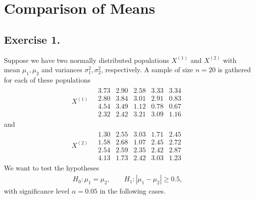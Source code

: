 \section*{Comparison of Means}

\subsection*{Exercise 1.}

Suppose we have two normally distributed populations $X^{(1)}$ and $X^{(2)}$ with mean $\mu_1, \mu_2$ and variances $\sigma_1^2, \sigma_2^2$, respectively. A sample of size $n = 20$ is gathered for each of these populations
\begin{align*}
X^{(1)} \quad 
\begin{array}{ccccc}
3.73 & 2.90 & 2.58 & 3.33 & 3.34 \\
2.80 & 3.84 & 3.01 & 2.91 & 0.83 \\
4.54 & 3.49 & 1.12 & 0.78 & 0.67 \\
2.32 & 2.42 & 3.21 & 3.09 & 1.16
\end{array}
\end{align*}
and
\begin{align*}
X^{(2)} \quad
\begin{array}{ccccc}
1.30 & 2.55 & 3.03 & 1.71 & 2.45 \\
1.58 & 2.68 & 1.07 & 2.45 & 2.72 \\
2.54 & 2.59 & 2.35 & 2.42 & 2.87 \\
4.13 & 1.73 & 2.42 & 3.03 & 1.23
\end{array}
\end{align*}
We want to test the hypotheses
\begin{align*}
H_0: \mu_1 = \mu_2, \qquad H_1: |\mu_1 - \mu_2| \geq 0.5,
\end{align*}
with significance level $\alpha = 0.05$ in the following cases.
